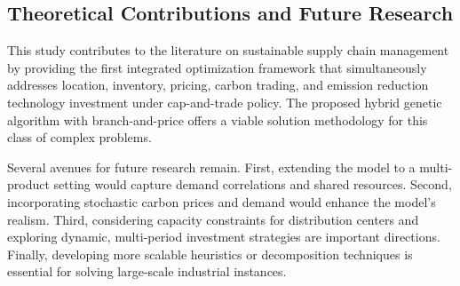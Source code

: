 \documentclass[]{article}
\theoremstyle{plain}%
\theoremstyle{definition}
\theoremstyle{remark}
\theoremstyle{plain}%
\begin{document}
\subsection{Theoretical Contributions and Future Research}
This study contributes to the literature on sustainable supply chain management by providing the first integrated optimization framework that simultaneously addresses location, inventory, pricing, carbon trading, and emission reduction technology investment under cap-and-trade policy. The proposed hybrid genetic algorithm with branch-and-price offers a viable solution methodology for this class of complex problems.

Several avenues for future research remain. First, extending the model to a multi-product setting would capture demand correlations and shared resources. Second, incorporating stochastic carbon prices and demand would enhance the model's realism. Third, considering capacity constraints for distribution centers and exploring dynamic, multi-period investment strategies are important directions. Finally, developing more scalable heuristics or decomposition techniques is essential for solving large-scale industrial instances.

    
    
    
    
\end{document}

